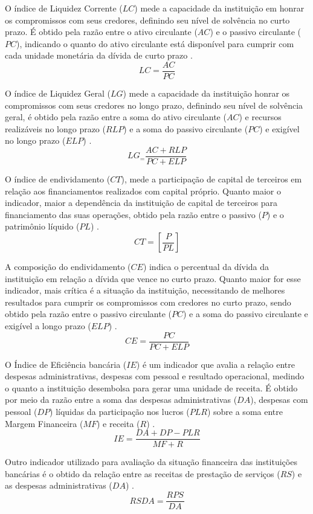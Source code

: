 \documentclass[12pt,12pt,openright,oneside,a4paper,chapter=TITLE,section=TITLE,subsection=TITLE,subsubsection=TITLE,english,french,spanish,portugues,sumario=tradicional]{abntex2}
\begin{document}
O índice de Liquidez Corrente (\(LC\)) mede a capacidade da instituição em honrar os compromissos com seus credores, definindo seu nível de solvência no curto prazo. É obtido pela razão entre o ativo circulante (\(AC\)) e o passivo circulante (\(PC\)), indicando o quanto do ativo circulante está disponível para cumprir com cada unidade monetária da dívida de curto prazo \cite{graham:2012} \cite{assaf:2020}.
\[
LC = \frac{AC}{PC}
\]

O índice de Liquidez Geral (\(LG\)) mede a capacidade da instituição honrar os compromissos com seus credores no longo prazo, definindo seu nível de solvência geral, é obtido pela razão entre a soma do ativo circulante (\(AC\)) e recursos realizáveis no longo prazo (\(RLP\)) e a soma do passivo circulante (\(PC\)) e exigível no longo prazo (\(ELP\)) \cite{assaf:2020}.
\[
LG_ = \frac{AC + RLP}{PC + ELP}
\]

O índice de endividamento (\(CT\)), mede a participação de capital de terceiros em relação aos financiamentos realizados com capital próprio. Quanto maior o indicador, maior a dependência da instituição de capital de terceiros para financiamento das suas operações, obtido pela razão entre o passivo (\(P\)) e o patrimônio líquido (\(PL\)) \cite{assaf:2020}.
\[
CT = [\frac{P}{PL}]
\]

A composição do endividamento (\(CE\)) indica o percentual da dívida da instituição em relação a dívida que vence no curto prazo. Quanto maior for esse indicador, mais crítica é a situação da instituição, necessitando de melhores resultados para cumprir os compromissos com credores no curto prazo, sendo obtido pela razão entre o passivo circulante (\(PC\)) e a soma do passivo circulante e exigível a longo prazo (\(ELP\)) \cite{assaf:2020}.
\[
CE = \frac{PC}{PC + ELP}
\]

O Índice de Eficiência bancária (\(IE\)) é um indicador que avalia a relação entre despesas administrativas, despesas com pessoal e resultado operacional, medindo o quanto a instituição desembolsa para gerar uma unidade de receita. É obtido por meio da razão entre a soma das despesas administrativas (\(DA\)), despesas com pessoal (\(DP\)) líquidas da participação nos lucros (\(PLR\)) sobre a soma entre Margem Financeira (\(MF\)) e receita (\(R\)) \cite{timotio:2018}.\\
\[
IE = \frac{DA + DP - PLR}{MF + R} 
\]

Outro indicador utilizado para avaliação da situação financeira das instituições bancárias é o obtido da relação entre as receitas de prestação de serviços (\(RS\)) e as despesas administrativas (\(DA\)) \cite{dantas:2012}.
\[
RSDA = \frac{RPS_{}}{DA_{}}
\]
\end{document}
